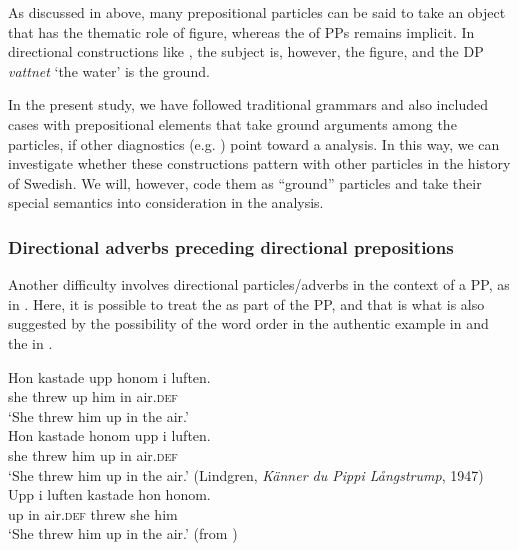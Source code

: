 \documentclass[output=paper]{langscibook}
\begin{document}
As discussed in  above, many prepositional particles can be said to take an object that has the thematic role of figure, whereas the  of PPs remains implicit. In directional constructions like , the subject is, however, the figure, and the DP \textit{vattnet} ‘the water’ is the ground.



In the present study, we have followed traditional grammars and also included cases with prepositional elements that take ground arguments among the particles, if other diagnostics (e.g. ) point toward a  analysis. In this way, we can investigate whether these constructions pattern with other particles in the history of Swedish. We will, however, code them as “ground” particles and take their special semantics into consideration in the analysis.



\subsubsection{Directional adverbs preceding directional prepositions} 
Another difficulty involves directional particles/adverbs in the context of a PP, as in . Here, it is possible to treat the  as part of the PP, and that is what is also suggested by the possibility of the word order in the authentic example in  and the  in .


\ea\label{ex:lalu:17}
\ea\label{ex:lalu:17a}
\gll  Hon   kastade   upp    honom   i   luften.\\
    she     threw   up   him     in     air\textsc{.def}\\
\glt `She threw him up in the air.’\\

\ex\label{ex:lalu:17b}
\gll  Hon   kastade   honom   upp   i   luften.\\
    she     threw   him     up   in   air\textsc{.def}\\
\glt `She threw him up in the air.’ (Lindgren, \textit{Känner du Pippi Långstrump}, 1947)\\
\ex\label{ex:lalu:17c}
\gll Upp   i   luften   kastade   hon   honom. \\
    up     in   air.\textsc{def}   threw   she   him\\
\glt `She threw him up in the air.’     (from \citealt{LarssonLundquist2014})\\
\z
\z
\end{document}
